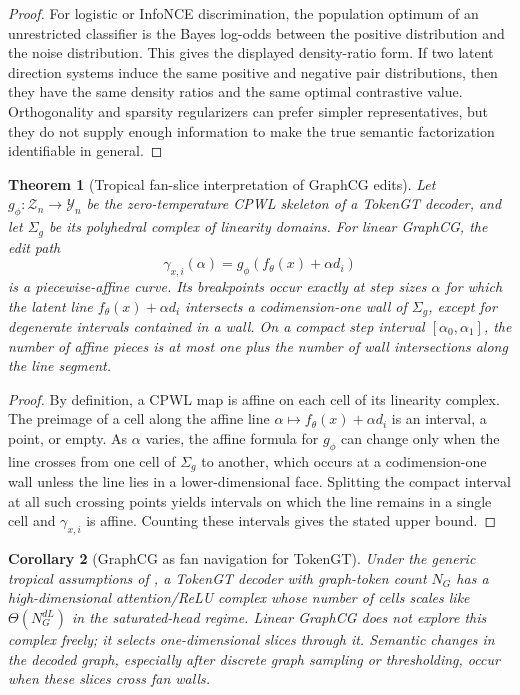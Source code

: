 \documentclass[11pt]{article}
\newtheorem{theorem}{Theorem}[section]
\newtheorem{corollary}[theorem]{Corollary}
\newcommand{\cZ}{\mathcal{Z}}
\newcommand{\cY}{\mathcal{Y}}
\begin{document}
\begin{proof}
For logistic or InfoNCE discrimination, the population optimum of an unrestricted classifier is the Bayes log-odds between the positive distribution and the noise distribution.  This gives the displayed density-ratio form.  If two latent direction systems induce the same positive and negative pair distributions, then they have the same density ratios and the same optimal contrastive value.  Orthogonality and sparsity regularizers can prefer simpler representatives, but they do not supply enough information to make the true semantic factorization identifiable in general.
\end{proof}

\begin{theorem}[Tropical fan-slice interpretation of GraphCG edits]
\label{thm:graphcg-tropical}
Let $g_\phi:\cZ_n\to\cY_n$ be the zero-temperature CPWL skeleton of a TokenGT decoder, and let $\Sigma_g$ be its polyhedral complex of linearity domains.  For linear GraphCG, the edit path
\[
  \gamma_{x,i}(\alpha)=g_\phi(f_\theta(x)+\alpha d_i)
\]
is a piecewise-affine curve.  Its breakpoints occur exactly at step sizes $\alpha$ for which the latent line $f_\theta(x)+\alpha d_i$ intersects a codimension-one wall of $\Sigma_g$, except for degenerate intervals contained in a wall.  On a compact step interval $[\alpha_0,\alpha_1]$, the number of affine pieces is at most one plus the number of wall intersections along the line segment.
\end{theorem}

\begin{proof}
By definition, a CPWL map is affine on each cell of its linearity complex.  The preimage of a cell along the affine line $\alpha\mapsto f_\theta(x)+\alpha d_i$ is an interval, a point, or empty.  As $\alpha$ varies, the affine formula for $g_\phi$ can change only when the line crosses from one cell of $\Sigma_g$ to another, which occurs at a codimension-one wall unless the line lies in a lower-dimensional face.  Splitting the compact interval at all such crossing points yields intervals on which the line remains in a single cell and $\gamma_{x,i}$ is affine.  Counting these intervals gives the stated upper bound.
\end{proof}

\begin{corollary}[GraphCG as fan navigation for TokenGT]
\label{cor:graphcg-fan-navigation}
Under the generic tropical assumptions of , a TokenGT decoder with graph-token count $N_G$ has a high-dimensional attention/ReLU complex whose number of cells scales like $\Theta(N_G^{dL})$ in the saturated-head regime.  Linear GraphCG does not explore this complex freely; it selects one-dimensional slices through it.  Semantic changes in the decoded graph, especially after discrete graph sampling or thresholding, occur when these slices cross fan walls.
\end{corollary}
\end{document}
